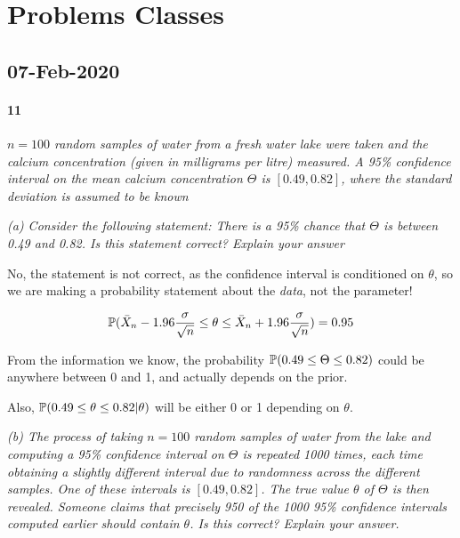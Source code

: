 \documentclass[a4paper]{article}
\begin{document}
    \newpage
    \section*{Problems Classes}
        \subsection*{07-Feb-2020}
            \paragraph{11}
            \textit{$n = 100$ random samples of water from a fresh water lake
            were taken and the calcium concentration (given in milligrams per
            litre) measured. A 95\% confidence interval on the mean calcium
            concentration $\Theta$ is $[0.49, 0.82]$, where the standard
            deviation is assumed to be known}

            \textit{(a) Consider the following statement: There is a 95\% chance
            that $\Theta$ is between 0.49 and 0.82. Is this statement correct?
            Explain your answer}

                No, the statement is not correct, as the confidence interval is
                conditioned on $\theta$, so we are making a probability
                statement about the \textit{data}, not the parameter!

                \[
                    \mathbb{P}(\bar X_n - 1.96 \frac{\sigma}{\sqrt{n}} \leq \theta
                    \leq \bar X_n + 1.96 \frac{\sigma}{\sqrt{n}}) = 0.95
                \]

                From the information we know, the probability $\mathbb{P}(0.49 \leq
                \Theta \leq 0.82)$ could be anywhere between 0 and 1, and
                actually depends on the prior.

                Also, $\mathbb{P}(0.49 \leq \theta \leq 0.82 | \theta)$ will be
                either 0 or 1 depending on $\theta$.

            \textit{(b) The process of taking $n = 100$ random samples of water
            from the lake and computing a 95\% confidence interval on $\Theta$
            is repeated 1000 times, each time obtaining a slightly different
            interval due to randomness across the different samples. One of
            these intervals is $[0.49, 0.82]$. The true value $\theta$ of
            $\Theta$ is then revealed. Someone claims that precisely 950 of the
            1000 95\% confidence intervals computed earlier should contain
            $\theta$. Is this correct? Explain your answer.}
\end{document}

